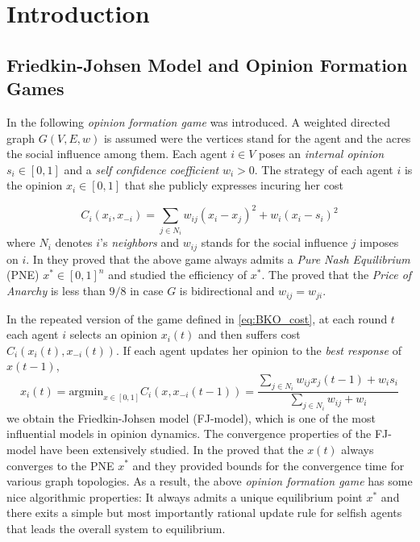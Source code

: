 \section{Introduction}

\subsection{Friedkin-Johsen Model and Opinion Formation Games}
In \cite{BKO11} the following \emph{opinion formation game} was introduced.
A weighted directed graph $G(V,E,w)$ is assumed were the vertices stand for the
agent and the acres the social influence among them. Each agent $i \in V$ poses an
\emph{internal opinion} $s_i \in [0,1]$ and a \emph{self confidence coefficient} $w_i>0$. The strategy of
each agent $i$ is the opinion $x_i\in [0,1]$ that she publicly expresses incuring her cost

\begin{equation}\label{eq:BKO_cost}
  C_i(x_i,x_{-i}) = \sum_{j \in N_i}w_{ij}(x_i-x_j)^2 + w_i(x_i -s_i)^2
\end{equation}
\noindent where $N_i$ denotes $i$'s \emph{neighbors} and $w_{ij}$ stands for
the social influence $j$ imposes on $i$. In \cite{BKO11} they proved that
the above game always admits a \emph{Pure Nash Equilibrium} (PNE) $x^* \in [0,1]^n$
and studied the efficiency of $x^*$. The proved that the \emph{Price of Anarchy}
is less than $9/8$ in case $G$ is bidirectional and $w_{ij}=w_{ji}$.

In the repeated version of the game defined in \ref{eq:BKO_cost}, at each round $t$ each agent $i$
selects an opinion $x_i(t)$ and then suffers cost $C_i(x_i(t),x_{-i}(t))$. If each agent updates
her opinion to the \emph{best response} of $x(t-1)$,
\begin{equation}\label{eq:FJ_model}
x_i(t) = \text{argmin}_{x \in [0,1]}C_i(x,x_{-i}(t-1))=\frac{\sum_{j \in N_i}w_{ij}x_j(t-1) + w_is_i}{\sum_{j \in N_i}w_{ij} + w_i}
\end{equation}
\noindent we obtain the Friedkin-Johsen model (FJ-model), which is one of the most influential models in opinion dynamics.
The convergence properties of the FJ-model have been extensively studied. In \cite{GS14} the proved that the $x(t)$ always converges
to the PNE $x^*$ and they provided bounds for the convergence time for various graph topologies. As a result, the
above \emph{opinion formation game} has some nice algorithmic properties: It always admits a unique equilibrium point $x^*$ and there
exits a simple but most importantly rational update rule for selfish agents that leads the overall system to equilibrium.

